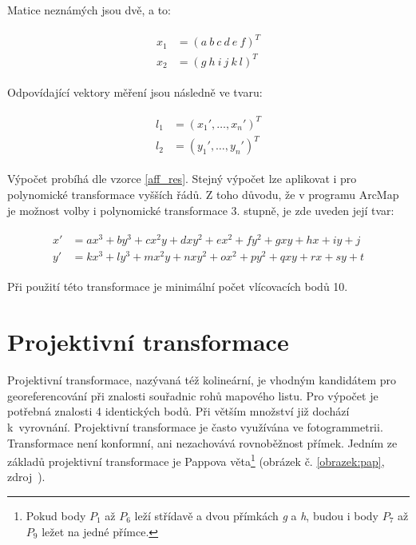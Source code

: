 \documentclass[thesis=M,czech]{FITthesis}[2012/06/26]
\begin{document}
Matice neznámých jsou dvě, a to:

\begin{align} \label{poly2_x12}
\begin{split}
x_1 &= (a\ b\ c\ d\ e\ f)^T  \\
x_2 &= (g\ h\ i\ j\ k\ l)^T
\end{split}
\end{align}

Odpovídající vektory měření jsou následně ve tvaru:

\begin{align} \label{poly2_l12}
\begin{split}
l_1 &= (x_1', \ldots , x_n')^T  \\
l_2 &= ( y_1', \ldots , y_n')^T
\end{split}
\end{align}

Výpočet probíhá dle vzorce \eqref{aff_res}. Stejný výpočet lze aplikovat i pro polynomické transformace vyšších řádů. Z toho důvodu, že v programu ArcMap je možnost volby i polynomické transformace 3. stupně, je zde uveden její tvar:


\begin{align} \label{poly_3}
\begin{split}
x' &= ax^3 + by^3 + cx^2y + dxy^2 + ex^2 + fy^2 + gxy + hx + iy + j \\
y' &= kx^3 + ly^3 + mx^2y + nxy^2 + ox^2 + py^2 + qxy + rx + sy + t  
\end{split}
\end{align}

Při použití této transformace je minimální počet vlícovacích bodů 10. 



\section{Projektivní transformace}
Projektivní transformace, nazývaná též kolineární, je vhodným kandidátem pro georeferencování při znalosti souřadnic rohů mapového listu. Pro výpočet je potřebná znalosti 4 identických bodů. Při větším množství již dochází k~vyrovnání. Projektivní transformace je často využívána ve fotogrammetrii. Transformace není konformní, ani nezachovává rovnoběžnost přímek. Jedním ze základů projektivní transformace je Pappova věta\footnote{Pokud body $P_1$ až $P_6$ leží střídavě a dvou přímkách \textit{g} a \textit{h}, budou i body $P_7$ až $P_9$ ležet na jedné přímce.} (obrázek č. \ref{obrazek:pap}, zdroj~\cite{pappova}).
\newpage
\end{document}

